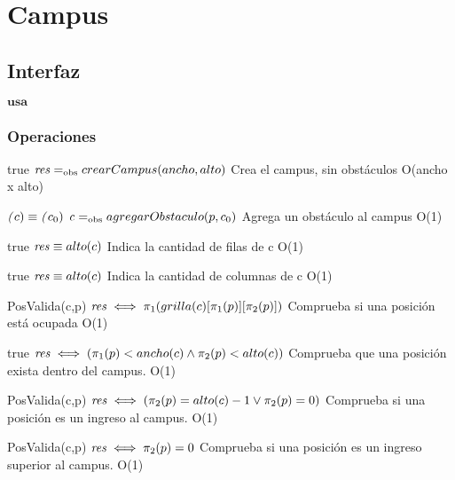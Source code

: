 \section{Campus}

\subsection{Interfaz}

$\textbf{usa}$  


\subsubsection*{Operaciones}


 {true}
 {$\text{\textit{res}} =_{\mathrm{obs}} crearCampus(ancho, alto) $}
 {Crea el campus, sin obstáculos}
 {O(ancho x alto)}
 {}
 
 {$ \text{\textit{(}}c) \equiv \text{\textit{(}}c_0) $}
 {$\text{\textit{c}} =_{\mathrm{obs}} agregarObstaculo(p, c_0) $}
 {Agrega un obstáculo al campus}
 {O(1)}
 {}
 
 {true}
 {$\text{\textit{res}} \equiv alto(c) $}
 {Indica la cantidad de filas de c}
 {O(1)}
 {}

 {true}
 {$\text{\textit{res}} \equiv alto(c) $}
 {Indica la cantidad de columnas de c}
 {O(1)}
 {}
  
 {PosValida(c,p)}
 {$\text{\textit{res}} \iff \pi_1(grilla(c)[\pi_1(p)][\pi_2(p)])  $}
 {Comprueba si una posición está ocupada}
 {O(1)}
 {}
   
 {true}
 {$\text{\textit{res}} \iff (\pi_1(p)<ancho(c)\land \pi_2(p)<alto(c)) $}
 {Comprueba que una posición exista dentro del campus.}
 {O(1)}
 {}
    
 {PosValida(c,p)}
 {$\text{\textit{res}} \iff (\pi_2(p)=alto(c)-1 \lor \pi_2(p)=0) $}
 {Comprueba si una posición es un ingreso al campus.}
 {O(1)}
 {}
   
 {PosValida(c,p)}
 {$\text{\textit{res}} \iff \pi_2(p)=0 $}
 {Comprueba si una posición es un ingreso superior al campus.}
 {O(1)}
 {}
 
